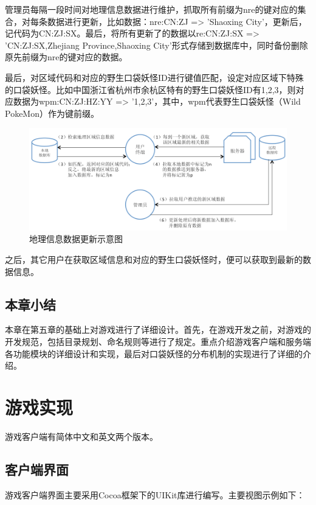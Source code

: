 \documentclass{article}
\begin{document}
\begin{CJK}{UTF8}{gbsn}
  管理员每隔一段时间对地理信息数据进行维护，抓取所有前缀为nre的键对应的集合，对每条数据进行更新，比如数据：nre:CN:ZJ => 'Shaoxing City'，更新后，记代码为CN:ZJ:SX。最后，将所有更新了的数据以re:CN:ZJ:SX => 'CN:ZJ:SX,Zhejiang Province,Shaoxing City'形式存储到数据库中，同时备份删除原先前缀为nre的键对应的数据。

  最后，对区域代码和对应的野生口袋妖怪ID进行键值匹配，设定对应区域下特殊的口袋妖怪。比如中国浙江省杭州市余杭区特有的野生口袋妖怪ID有1,2,3，则对应数据为wpm:CN:ZJ:HZ:YY => '1,2,3'，其中，wpm代表野生口袋妖怪（Wild PokeMon）作为键前缀。

  \begin{figure}[htbp]
		\centering
		\includegraphics[bb=0 0 786 367, scale=0.45]{figure/fig_n20.png}
		\caption{地理信息数据更新示意图}
		\label{fig:n20}
	\end{figure}

  之后，其它用户在获取区域信息和对应的野生口袋妖怪时，便可以获取到最新的数据信息。

	\subsection{本章小结}
  本章在第五章的基础上对游戏进行了详细设计。首先，在游戏开发之前，对游戏的开发规范，包括目录规划、命名规则等进行了规定。重点介绍游戏客户端和服务端各功能模块的详细设计和实现，最后对口袋妖怪的分布机制的实现进行了详细的介绍。


	\section{游戏实现}
  游戏客户端有简体中文和英文两个版本。

	\subsection{客户端界面}
  游戏客户端界面主要采用Cocoa框架下的UIKit库进行编写。主要视图示例如下：


\end{CJK}
\end{document}
